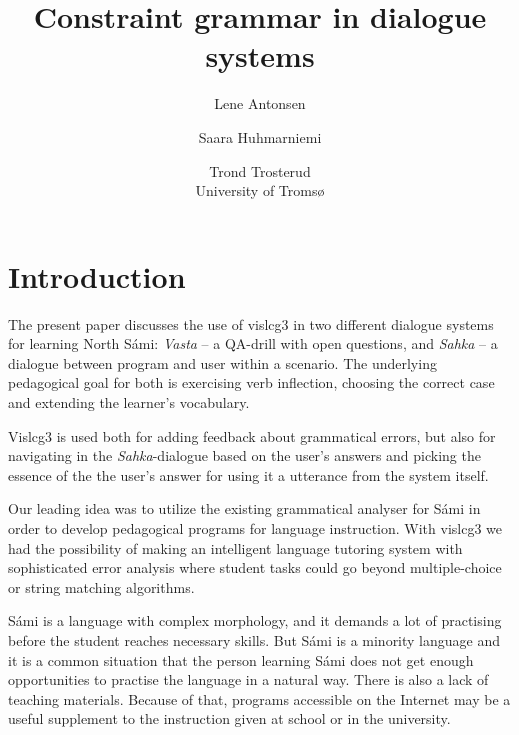 \documentclass[11pt]{article}
\title{Constraint grammar in dialogue systems}
\author{Lene Antonsen  \and
              Saara Huhmarniemi \and Trond Trosterud \\ University of Tromsø}
\begin{document}

\maketitle
{}
 
\maketitle




\section{Introduction} 

The present paper discusses the use of vislcg3 in two different dialogue systems for learning North Sámi: \textit{Vasta} -- a QA-drill with open questions, and \textit{Sahka} -- a  dialogue between program and user within a scenario. The underlying pedagogical goal for both is exercising verb inflection, choosing the correct case and extending the learner's vocabulary. 



Vislcg3 is used both for adding feedback about grammatical errors, but also for navigating in the \textit{Sahka}-dialogue based on the user's answers and picking the essence of the the user's answer for using it a utterance from the system itself. 

Our leading idea was to utilize the existing grammatical analyser for Sámi in order to develop pedagogical programs for language instruction. With vislcg3 we had the possibility of making an intelligent language tutoring system with sophisticated error analysis where student tasks could go beyond multiple-choice or string matching algorithms. 

Sámi is a language with complex morphology, and it demands a lot of practising before the student reaches necessary skills. But Sámi is a minority language and it is a common situation that the person learning Sámi does not get enough opportunities to practise the language in a natural way. There is also a lack of teaching materials. Because of that, programs accessible on the Internet may be a useful supplement to the instruction given at school or in the university. 
\end{document}
